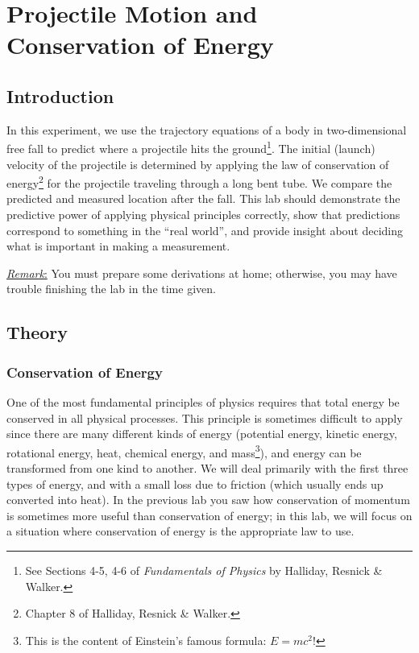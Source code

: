 \chapter{Projectile Motion and Conservation of Energy}
\label{chap:projectile}
\section{Introduction}
In this experiment, we use the trajectory equations of a body in two-dimensional free fall to predict where a projectile hits the ground\footnote{See Sections 4-5, 4-6 of \emph{Fundamentals of Physics} by Halliday, Resnick \& Walker.}. The initial (launch) velocity of the projectile is determined by applying the law of conservation of energy\footnote{Chapter 8 of Halliday, Resnick \& Walker.} for the projectile traveling through a long bent tube. We compare the predicted and measured location after the fall. This lab should demonstrate the predictive power of applying physical principles correctly, show that predictions correspond to something in the ``real world'', and provide insight about deciding what is important in making a measurement.\myskip

\underline{\emph{Remark}:} You must prepare some derivations at home; otherwise, you may have trouble finishing the lab in the time given.

\section{Theory}
\subsection{Conservation of Energy}
One of the most fundamental principles of physics requires that total energy be conserved in all physical processes. This principle is sometimes difficult to apply since there are many different kinds of energy (potential energy, kinetic energy, rotational energy, heat, chemical energy, and mass\footnote{This is the content of Einstein's famous formula: $E=mc^2$!}), and energy can be transformed from one kind to another. We will deal primarily with the first three types of energy, and with a small loss due to friction (which usually ends up converted into heat). In the previous lab you saw how conservation of momentum is sometimes more useful than conservation of energy; in this lab, we will focus on a situation where conservation of energy is the appropriate law to use.\myskip

